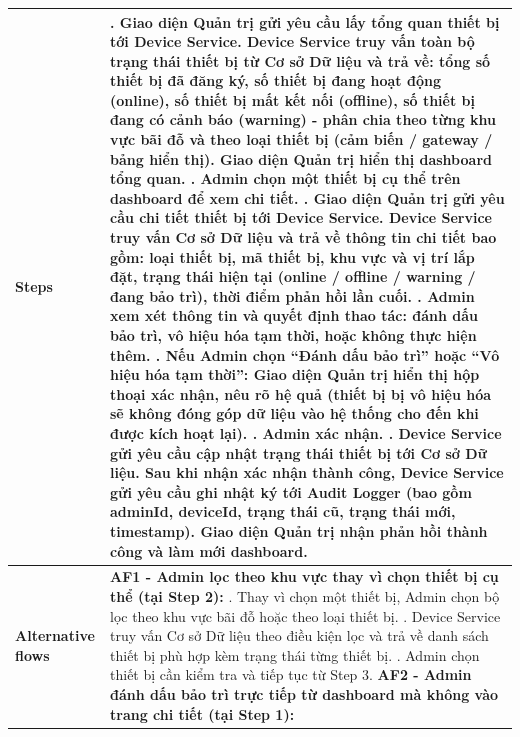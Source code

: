 {\begin{longtable}{|>{\raggedright\arraybackslash}p{4cm}|>{\raggedright\arraybackslash}p{11.5cm}|}
\textbf{Steps} &
1. Giao diện Quản trị gửi yêu cầu lấy tổng quan thiết bị tới Device Service. Device Service truy vấn toàn bộ trạng thái thiết bị từ Cơ sở Dữ liệu và trả về: tổng số thiết bị đã đăng ký, số thiết bị đang hoạt động (online), số thiết bị mất kết nối (offline), số thiết bị đang có cảnh báo (warning) - phân chia theo từng khu vực bãi đỗ và theo loại thiết bị (cảm biến / gateway / bảng hiển thị). Giao diện Quản trị hiển thị dashboard tổng quan. \newline
2. Admin chọn một thiết bị cụ thể trên dashboard để xem chi tiết. \newline
3. Giao diện Quản trị gửi yêu cầu chi tiết thiết bị tới Device Service. Device Service truy vấn Cơ sở Dữ liệu và trả về thông tin chi tiết bao gồm: loại thiết bị, mã thiết bị, khu vực và vị trí lắp đặt, trạng thái hiện tại (online / offline / warning / đang bảo trì), thời điểm phản hồi lần cuối. \newline
4. Admin xem xét thông tin và quyết định thao tác: đánh dấu bảo trì, vô hiệu hóa tạm thời, hoặc không thực hiện thêm. \newline
5. Nếu Admin chọn ``Đánh dấu bảo trì'' hoặc ``Vô hiệu hóa tạm thời'': Giao diện Quản trị hiển thị hộp thoại xác nhận, nêu rõ hệ quả (thiết bị bị vô hiệu hóa sẽ không đóng góp dữ liệu vào hệ thống cho đến khi được kích hoạt lại). \newline
6. Admin xác nhận. \newline
7. Device Service gửi yêu cầu cập nhật trạng thái thiết bị tới Cơ sở Dữ liệu. Sau khi nhận xác nhận thành công, Device Service gửi yêu cầu ghi nhật ký tới Audit Logger (bao gồm adminId, deviceId, trạng thái cũ, trạng thái mới, timestamp). Giao diện Quản trị nhận phản hồi thành công và làm mới dashboard. \\ \hline
\textbf{Alternative flows} &
\textbf{AF1 - Admin lọc theo khu vực thay vì chọn thiết bị cụ thể (tại Step 2):} \newline
2.1. Thay vì chọn một thiết bị, Admin chọn bộ lọc theo khu vực bãi đỗ hoặc theo loại thiết bị. \newline
2.2. Device Service truy vấn Cơ sở Dữ liệu theo điều kiện lọc và trả về danh sách thiết bị phù hợp kèm trạng thái từng thiết bị. \newline
2.3. Admin chọn thiết bị cần kiểm tra và tiếp tục từ Step 3. \newline\newline
\textbf{AF2 - Admin đánh dấu bảo trì trực tiếp từ dashboard mà không vào trang chi tiết (tại Step 1):} \newline

\end{longtable}}

